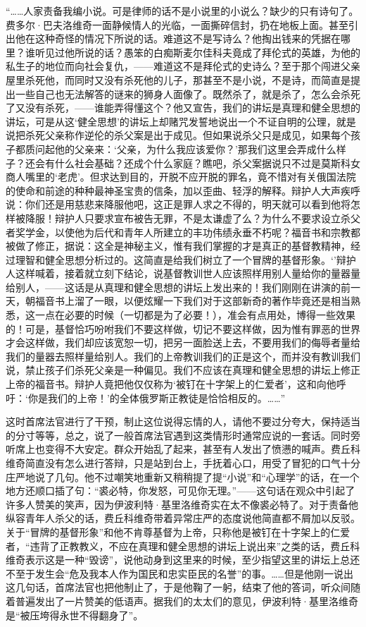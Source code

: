 \par “……人家责备我编小说。可是律师的话不是小说里的小说么？缺少的只有诗句了。费多尔·巴夫洛维奇一面静候情人的光临，一面撕碎信封，扔在地板上面。甚至引出他在这种奇怪的情况下所说的话。难道这不是写诗么？他掏出钱来的凭据在哪里？谁听见过他所说的话？愚笨的白痴斯麦尔佳科夫竟成了拜伦式的英雄，为他的私生子的地位而向社会复仇，——难道这不是拜伦式的史诗么？至于那个闯进父亲屋里杀死他，而同时又没有杀死他的儿子，那甚至不是小说，不是诗，而简直是提出一些自己也无法解答的谜来的狮身人面像了。既然杀了，就是杀了，怎么会杀死了又没有杀死，——谁能弄得懂这个？他又宣告，我们的讲坛是真理和健全思想的讲坛，可是从这‘健全思想’的讲坛上却赌咒发誓地说出一个不证自明的公理，就是说把杀死父亲称作逆伦的杀父案是出于成见。但如果说杀父只是成见，如果每个孩子都质问起他的父亲来：‘父亲，为什么我应该爱你？’那我们这里会弄成什么样子？还会有什么社会基础？还成个什么家庭？瞧吧，杀父案据说只不过是莫斯科女商人嘴里的‘老虎’。但求达到目的，开脱不应开脱的罪名，竟不惜对有关俄国法院的使命和前途的种种最神圣宝贵的信条，加以歪曲、轻浮的解释。辩护人大声疾呼说：你们还是用慈悲来降服他吧，这正是罪人求之不得的，明天就可以看到他将怎样被降服！辩护人只要求宣布被告无罪，不是太谦虚了么？为什么不要求设立杀父者奖学金，以使他为后代和青年人所建立的丰功伟绩永垂不朽呢？福音书和宗教都被做了修正，据说：这全是神秘主义，惟有我们掌握的才是真正的基督教精神，经过理智和健全思想分析过的。这简直是给我们树立了一个冒牌的基督形象。‘’辩护人这样喊着，接着就立刻下结论，说基督教训世人应该照样用别人量给你的量器量给别人，——这话是从真理和健全思想的讲坛上发出来的！我们刚刚在讲演的前一天，朝福音书上溜了一眼，以便炫耀一下我们对于这部新奇的著作毕竟还是相当熟悉，这一点在必要的时候（一切都是为了必要！），准会有点用处，博得一些效果的！可是，基督恰巧吩咐我们不要这样做，切记不要这样做，因为惟有罪恶的世界才会这样做，我们却应该宽恕一切，把另一面脸送上去，不要用我们的侮辱者量给我们的量器去照样量给别人。我们的上帝教训我们的正是这个，而并没有教训我们说，禁止孩子们杀死父亲是一种偏见。我们不应该在真理和健全思想的讲坛上修正上帝的福音书。辩护人竟把他仅仅称为‘被钉在十字架上的仁爱者’，这和向他呼吁：‘你是我们的上帝！’的全体俄罗斯正教徒是恰恰相反的。……”
\par 这时首席法官进行了干预，制止这位说得忘情的人，请他不要过分夸大，保持适当的分寸等等，总之，说了一般首席法官遇到这类情形时通常应说的一套话。同时旁听席上也变得不大安定。群众开始乱了起来，甚至有人发出了愤懑的喊声。费丘科维奇简直没有怎么进行答辩，只是站到台上，手抚着心口，用受了冒犯的口气十分庄严地说了几句。他不过嘲笑地重新又稍稍提了提“小说”和“心理学”的话，在一个地方还顺口插了句：“裘必特，你发怒，可见你无理。”——这句话在观众中引起了许多人赞美的笑声，因为伊波利特·基里洛维奇实在太不像裘必特了。对于责备他纵容青年人杀父的话，费丘科维奇带着异常庄严的态度说他简直都不屑加以反驳。关于“冒牌的基督形象”和他不肯尊基督为上帝，只称他是被钉在十字架上的仁爱者，“违背了正教教义，不应在真理和健全思想的讲坛上说出来”之类的话，费丘科维奇表示这是一种“毁谤”，说他动身到这里来的时候，至少指望这里的讲坛上总还不至于发生会“危及我本人作为国民和忠实臣民的名誉”的事。……但是他刚一说出这几句话，首席法官也把他制止了，于是他鞠了一躬，结束了他的答词，听众间随着普遍发出了一片赞美的低语声。据我们的太太们的意见，伊波利特·基里洛维奇是“被压垮得永世不得翻身了”。
